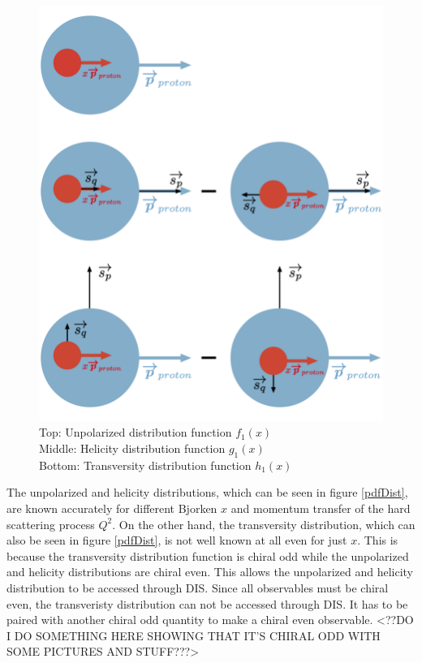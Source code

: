 \documentclass[abstract = on,listof=totoc, bibliography=totoc]{scrreprt}
\begin{document}
\begin{figure}
\begin{center}
\includegraphics[width = 1\textwidth]{allDistsPic3}
\caption[Visual representation of unpolarized, hellicity, and transversity distribution functions]{Top: Unpolarized distribution function $f_1(x)$ \\
Middle: Helicity distribution function $g_1(x)$ \\
Bottom: Transversity distribution function $h_1(x)$}
\label{fig:PDFs}
\end{center}
\end{figure}


The unpolarized and helicity distributions, which can be seen in figure \ref{pdfDist}, are known accurately for different Bjorken $x$ and momentum transfer of the hard scattering process $Q^2$. On the other hand, the transversity distribution, which can also be seen in figure \ref{pdfDist}, is not well known at all even for just $x$. This is because the transversity distribution function is chiral odd while the unpolarized and helicity distributions are chiral even. This allows the unpolarized and helicity distribution to be accessed through DIS. Since all observables must be chiral even, the transveristy distribution can not be accessed through DIS. It has to be paired with another chiral odd quantity to make a chiral even observable. <??DO I DO SOMETHING HERE SHOWING THAT IT'S CHIRAL ODD WITH SOME PICTURES AND STUFF???> \\ 
\end{document}
